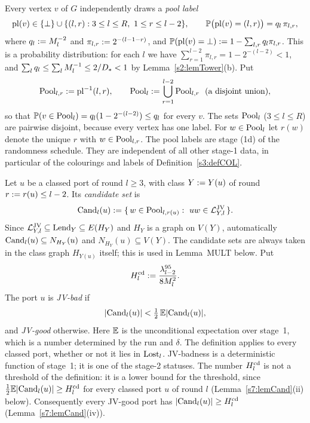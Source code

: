 \begin{definition}\label{s7:defPool}
Every vertex $v$ of $G$ independently draws a \emph{pool label}
\[
\mathrm{pl}(v)\in\{\bot\}\cup\{(l,r):3\le l\le R,\ 1\le r\le l-2\},\qquad
\mathbb{P}\bigl(\mathrm{pl}(v)=(l,r)\bigr)=q_l\,\pi_{l,r},
\]
where $q_l\mathrel{:=} M_l^{-2}$ and $\pi_{l,r}\mathrel{:=} 2^{-(l-1-r)}$, and
$\mathbb{P}(\mathrm{pl}(v)=\bot)\mathrel{:=} 1-\sum_{l,r}q_l\pi_{l,r}$. This is a probability
distribution: for each $l$ we have $\sum_{r=1}^{l-2}\pi_{l,r}=1-2^{-(l-2)}<1$,
and $\sum_l q_l\le\sum_l M_l^{-1}\le 2/D_{*}<1$ by
Lemma~\ref{s2:lemTower}(b). Put
\[
\mathrm{Pool}_{l,r}\mathrel{:=}\mathrm{pl}^{-1}(l,r),\qquad
\mathrm{Pool}_l\mathrel{:=}\bigcup_{r=1}^{l-2}\mathrm{Pool}_{l,r}\ \ \text{(a disjoint union)},
\]
so that $\mathbb{P}(v\in\mathrm{Pool}_l)=q_l(1-2^{-(l-2)})\le q_l$ for every $v$. The sets
$\mathrm{Pool}_l$ ($3\le l\le R$) are pairwise disjoint, because every vertex has one
label. For $w\in\mathrm{Pool}_l$ let $r(w)$ denote the unique $r$ with
$w\in\mathrm{Pool}_{l,r}$. The pool labels are stage (1d) of the randomness schedule.
They are independent of all other stage-1 data, in particular of the colourings
and labels of Definition~\ref{s3:defCOL}.
\deps{\ref{s2:lemTower}, \ref{s3:defCOL}}
\end{definition}

\begin{definition}\label{s7:defCand}
Let $u$ be a classed port of round $l\ge3$, with class $Y\mathrel{:=} Y(u)$ of round
$r\mathrel{:=} r(u)\le l-2$. Its \emph{candidate set} is
\[
\Cand_l(u)\defeq\{\,w\in\Pool_{l,r(u)}:\ uw\in\LJV_{Y,l}\,\}.
\]
Since $\mathcal{L}^{\mathrm{JV}}_{Y,l}\subseteq\mathrm{Lend}_Y\subseteq E(H_Y)$ and $H_Y$ is a graph on
$V(Y)$, automatically $\mathrm{Cand}_l(u)\subseteq N_{H_Y}(u)$ and
$N_{H_Y}(u)\subseteq V(Y)$. The
candidate sets are always taken in the class graph $H_{Y(u)}$ itself; this is
used in Lemma~MULT below. Put
\[
H^{\mathrm{cd}}_l\mathrel{:=}\frac{\lambda_{l-2}^{95}}{8M_l^{2}}.
\]
The port $u$ is \emph{JV-bad} if
\[
|\mathrm{Cand}_l(u)|<\tfrac12\,\mathbb{E}|\mathrm{Cand}_l(u)|,
\]
and \emph{JV-good} otherwise. Here $\mathbb{E}$ is the unconditional expectation over
stage~1, which is a number determined by the run and $\delta$. The definition
applies to every classed port, whether or not it lies in $\mathrm{Lost}_l$. JV-badness
is a deterministic function of stage~1; it is one of the stage-2 statuses. The
number $H^{\mathrm{cd}}_l$ is not a threshold of the definition: it is a lower bound for
the threshold, since $\tfrac12\mathbb{E}|\mathrm{Cand}_l(u)|\ge H^{\mathrm{cd}}_l$ for every classed port
$u$ of round $l$ (Lemma~\ref{s7:lemCand}(ii) below). Consequently every JV-good
port has $|\mathrm{Cand}_l(u)|\ge H^{\mathrm{cd}}_l$ (Lemma~\ref{s7:lemCand}(iv)).
\deps{\ref{s7:defPool}, \ref{s3:defCOL}, \ref{s6:defDesign}}
\end{definition}

